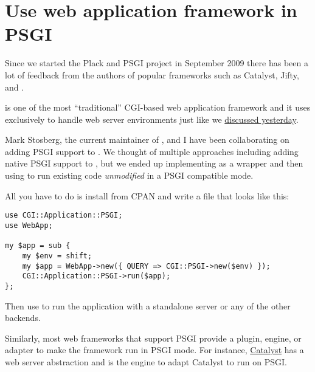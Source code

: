 \chapter{Use web application framework in
PSGI}\label{day-7-use-web-application-framework-in-psgi}

Since we started the Plack and PSGI project in September 2009 there has
been a lot of feedback from the authors of popular frameworks such as
Catalyst, Jifty, and .

\href{http://cgi-app.org/}{} is one of the most
``traditional'' CGI-based web application framework and it uses 
exclusively to handle web server environments just like we
\href{http://advent.plackperl.org/2009/12/day-6-convert-cgi-apps-to-psgi.html}{discussed
yesterday}.

Mark Stosberg, the current maintainer of , and I have
been collaborating on adding PSGI support to . We
thought of multiple approaches including adding native PSGI support to
, but we ended up implementing
\href{http://search.cpan.org/perldoc?CGI::PSGI}{} as a 
wrapper and then using
\href{http://search.cpan.org/perldoc?CGI::Application::PSGI}{}
to run existing  code \emph{unmodified} in a PSGI
compatible mode.

All you have to do is install  from CPAN and write
a  file that looks like this:

\begin{lstlisting}
use CGI::Application::PSGI;
use WebApp;

my $app = sub {
    my $env = shift;
    my $app = WebApp->new({ QUERY => CGI::PSGI->new($env) });
    CGI::Application::PSGI->run($app);
};
\end{lstlisting}

Then use
\href{http://advent.plackperl.org/2009/12/day-3-using-plackup.html}{}
to run the application with a standalone server or any of the other
backends.

Similarly, most web frameworks that support PSGI provide a plugin,
engine, or adapter to make the framework run in PSGI mode. For instance,
\href{http://www.catalystframework.org/}{Catalyst} has a
 web server abstraction and
\href{http://search.cpan.org/perldoc?Catalyst::Engine::PSGI}{}
is the engine to adapt Catalyst to run on PSGI. 

